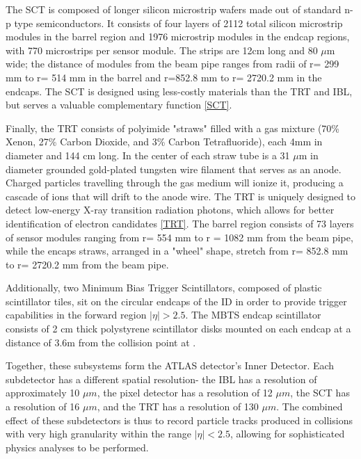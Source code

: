 The SCT is composed of longer silicon microstrip wafers made out of standard n-p type semiconductors. It consists of four layers of 2112 total silicon microstrip modules in the barrel region and 1976 microstrip modules in the endcap regions, with 770 microstrips per sensor module. The strips are 12cm long and 80 $\mu$m wide; the distance of modules from the beam pipe ranges from radii of r= 299 mm to r= 514 mm in the barrel and r=852.8 mm to r= 2720.2 mm in the endcaps. The SCT is designed using less-costly materials than the TRT and IBL, but serves a valuable complementary function \ref{SCT}.

Finally, the TRT consists of polyimide "straws" filled with a gas mixture (70\% Xenon, 27\% Carbon Dioxide, and 3\% Carbon Tetrafluoride), each 4mm in diameter and 144 cm long. In the center of each straw tube is a 31 $\mu$m in diameter grounded gold-plated tungsten wire filament that serves as an anode. Charged particles travelling through the gas medium will ionize it, producing a cascade of ions that will drift to the anode wire. The TRT is uniquely designed to detect low-energy X-ray transition radiation photons, which allows for better identification of electron candidates \ref{TRT}. The barrel region consists of 73 layers of sensor modules ranging from r= 554 mm to r = 1082 mm from the beam pipe, while the encaps straws, arranged in a "wheel" shape, stretch from r= 852.8 mm to r= 2720.2 mm from the beam pipe. 

Additionally, two Minimum Bias Trigger Scintillators, composed of plastic scintillator tiles, sit on the circular endcaps of the ID in order to provide trigger capabilities in the forward region $ |\eta| > 2.5 $. The MBTS endcap scintillator consists of 2 cm thick polystyrene scintillator disks mounted on each endcap at a distance of 3.6m from the collision point at . 

Together, these subsystems form the ATLAS detector's Inner Detector. Each subdetector has a different spatial resolution- the IBL has a resolution of  approximately 10 $\mu m$, the pixel detector has a resolution of 12 $\mu m$, the SCT has a resolution of 16 $\mu m$, and the TRT has a resolution of 130 $\mu m$. The combined effect of these subdetectors is thus to record particle tracks produced in collisions with very high granularity within the range $ | \eta | < 2.5$, allowing for sophisticated physics analyses to be performed. 

